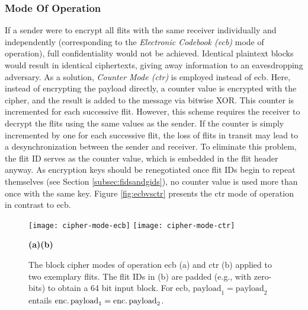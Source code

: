 \subsubsection{Mode Of Operation}
If a sender were to encrypt all flits with the same receiver individually and independently (corresponding to the \textit{Electronic Codebook
(\gls{ecb})} mode of operation), full confidentiality would not be achieved. Identical plaintext blocks would result in identical ciphertexts, giving
away information to an eavesdropping adversary. As a solution, \textit{Counter Mode (\gls{ctr})} is employed instead of \gls{ecb}. Here, instead of
encrypting the payload directly, a counter value is encrypted with the cipher, and the result is added to the message via bitwise XOR. This counter is
incremented for each successive flit. However, this scheme requires the receiver to decrypt the flits using the same values as the sender. If the counter is simply
incremented by one for each successive flit, the loss of flits in transit may lead to a desynchronization between the sender and receiver. To
eliminate this problem, the flit ID serves as the counter value, which is embedded in the flit header anyway. As encryption keys should be
renegotiated once flit IDs begin to repeat themselves (see Section \ref{subsec:fidsandgids}), no counter value is used more than once with the same
key. Figure \vref{fig:ecbvsctr} presents the \gls{ctr} mode of operation in contrast to \gls{ecb}.

\begin{figure}
    \centering
    \texttt{[image: cipher-mode-ecb]}\hfill
    \texttt{[image: cipher-mode-ctr]}\\
    \vspace{0.5\baselineskip}
    \begin{footnotesize}
        \hspace*{0.2\textwidth}\textbf{(a)}\hfill\textbf{(b)}\hspace*{0.19\textwidth}
    \end{footnotesize}
    \caption[ECB and CTR block cipher modes of operation]{The block cipher modes of operation \gls{ecb} (a) and \gls{ctr} (b) applied to two exemplary
    flits. The flit IDs in (b) are padded (e.g., with zero-bits) to obtain a 64 bit input block. For \gls{ecb}, $\text{payload}_1 = \text{payload}_2$
    entails $\text{enc.\,payload}_1 = \text{enc.\,payload}_2$.}
    \label{fig:ecbvsctr}
\end{figure}

